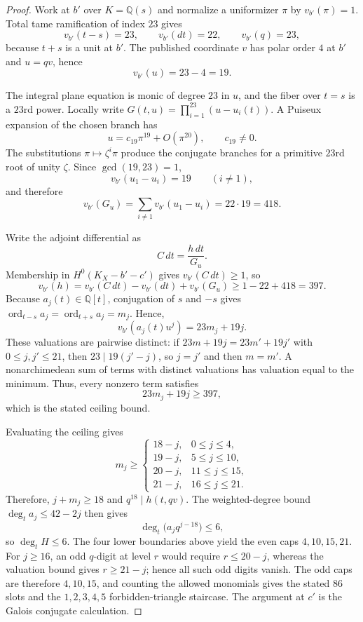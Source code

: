 \documentclass[11pt]{article}
\newcommand{\Q}{\mathbb Q}
\begin{document}
\begin{proof}
Work at $b'$ over $K=\Q(s)$ and normalize a uniformizer $\pi$ by
$v_{b'}(\pi)=1$.  Total tame ramification of index $23$ gives
\[
 v_{b'}(t-s)=23,\qquad v_{b'}(dt)=22,
 \qquad v_{b'}(q)=23,
\]
because $t+s$ is a unit at $b'$.  The published coordinate $v$ has
polar order $4$ at $b'$ and $u=qv$, hence
\[
 v_{b'}(u)=23-4=19.
\]

The integral plane equation is monic of degree $23$ in $u$, and the
fiber over $t=s$ is a $23$rd power.  Locally write
$G(t,u)=\prod_{i=1}^{23}(u-u_i(t))$.  A Puiseux expansion of the chosen
branch has
\[
 u=c_{19}\pi^{19}+O(\pi^{20}),\qquad c_{19}\ne0.
\]
The substitutions $\pi\mapsto\zeta^i\pi$ produce the conjugate branches for a
primitive $23$rd root of unity $\zeta$.  Since $\gcd(19,23)=1$,
\[
 v_{b'}(u_1-u_i)=19\qquad(i\ne1),
\]
and therefore
\[
 v_{b'}(G_u)=\sum_{i\ne1}v_{b'}(u_1-u_i)=22\cdot19=418.
\]

Write the adjoint differential as
\[
 C\,dt=\frac{h\,dt}{G_u}.
\]
Membership in $H^0(K_X-b'-c')$ gives $v_{b'}(C\,dt)\ge1$, so
\[
 v_{b'}(h)
 =v_{b'}(C\,dt)-v_{b'}(dt)+v_{b'}(G_u)
 \ge 1-22+418=397.
\]
Because $a_j(t)\in\Q[t]$, conjugation of $s$ and $-s$ gives
$\operatorname{ord}_{t-s}a_j=\operatorname{ord}_{t+s}a_j=m_j$.  Hence,
\[
 v_{b'}(a_j(t)u^j)=23m_j+19j.
\]
These valuations are pairwise distinct: if
$23m+19j=23m'+19j'$ with $0\le j,j'\le21$, then
$23\mid19(j'-j)$, so $j=j'$ and then $m=m'$.  A nonarchimedean sum of
terms with distinct valuations has valuation equal to the minimum.
Thus, every nonzero term satisfies
\[
 23m_j+19j\ge397,
\]
which is the stated ceiling bound.

Evaluating the ceiling gives
\[
 m_j\ge
 \begin{cases}
 18-j,&0\le j\le4,\\
 19-j,&5\le j\le10,\\
 20-j,&11\le j\le15,\\
 21-j,&16\le j\le21.
 \end{cases}
\]
Therefore, $j+m_j\ge18$ and $q^{18}\mid h(t,qv)$.  The weighted-degree
bound $\deg_ta_j\le42-2j$ then gives
\[
 \deg_t\bigl(a_jq^{j-18}\bigr)\le6,
\]
so $\deg_tH\le6$.  The four lower boundaries above yield the even
caps $4,10,15,21$.  For $j\ge16$, an odd $q$-digit at level $r$ would
require $r\le20-j$, whereas the valuation bound gives
$r\ge21-j$; hence all such odd digits vanish.  The odd caps are
therefore $4,10,15$, and counting the allowed monomials gives the
stated $86$ slots and the $1,2,3,4,5$ forbidden-triangle staircase.
The argument at $c'$ is the Galois conjugate calculation.
\end{proof}
\end{document}
